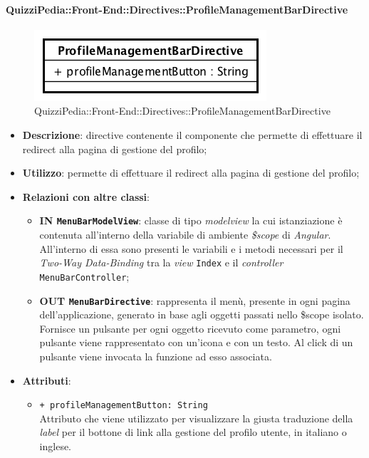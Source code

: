 \paragraph[QuizziPedia::Front-End::Directives\\::ProfileManagementBarDirective]{QuizziPedia::Front-End::Directives::ProfileManagementBarDirective}
\label{QuizziPedia::Front-End::Directives::ProfileManagementBarDirective}
\begin{figure} [ht]
	\centering
	\includegraphics[scale=0.80]{UML/Classi/Front-End/QuizziPedia_Front-end_Directives_ProfileManagementBarDirective.png}
	\caption{QuizziPedia::Front-End::Directives::ProfileManagementBarDirective}
\end{figure} \FloatBarrier
\begin{itemize}
	\item \textbf{Descrizione}: directive contenente il componente che permette di effettuare il redirect alla pagina di gestione del profilo;
	\item \textbf{Utilizzo}: permette di effettuare il redirect alla pagina di gestione del profilo;
	\item \textbf{Relazioni con altre classi}:
	\begin{itemize}
		\item \textbf{IN \texttt{MenuBarModelView}}: classe di tipo \textit{modelview} la cui istanziazione è contenuta all'interno della variabile di ambiente \textit{\$scope} di \textit{Angular}. All'interno di essa sono presenti le variabili e i metodi necessari per il \textit{Two-Way Data-Binding} tra la \textit{view} \texttt{Index} e il \textit{controller} \texttt{MenuBarController};
		\item \textbf{OUT \texttt{MenuBarDirective}}: rappresenta il menù, presente in ogni pagina dell'applicazione, generato in base agli oggetti passati nello \$scope isolato. Fornisce un pulsante per ogni oggetto ricevuto come parametro, ogni pulsante viene rappresentato con un’icona e con un testo. Al click di un pulsante viene invocata la funzione ad esso associata.  
	\end{itemize}
	\item \textbf{Attributi}:
	\begin{itemize}
		\item \texttt{+ profileManagementButton: String} \\ Attributo che viene utilizzato per visualizzare la giusta traduzione della \textit{label} per il bottone di link alla gestione del profilo utente, in italiano o inglese.
	\end{itemize}
\end{itemize}